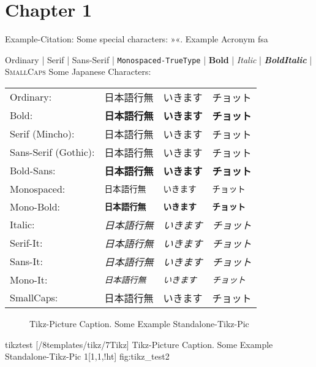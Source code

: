 
\chapter{Chapter 1}
\label{chap:chapter1}

Example-Citation:
\cite{DenKr_denkrement1_indeco}
\nl%
Some special characters:
»«.
\nl%
Example Acronym
\gls{fsa}

\npi%
Ordinary | \textrm{Serif} | \textsf{Sans-Serif} | \texttt{Monospaced-TrueType} | \textbf{Bold} | \textit{Italic} | \textit{\textbf{BoldItalic}} | \textsc{SmallCaps}\nl%
Some Japanese Characters:\nl%
\begin{tabular}{llll}%
Ordinary:&日本語行無&いきます&チョット\\%
Bold:&\textbf{日本語行無}&\textbf{いきます}&\textbf{チョット}\\%
Serif (Mincho):&\textrm{日本語行無}&\textrm{いきます}&\textrm{チョット}\\%
Sans-Serif (Gothic):&\textsf{日本語行無}&\textsf{いきます}&\textsf{チョット}\\%
Bold-Sans:&\textbf{\textsf{日本語行無}}&\textbf{\textsf{いきます}}&\textbf{\textsf{チョット}}\\%
Monospaced:&\texttt{日本語行無}&\texttt{いきます}&\texttt{チョット}\\%
Mono-Bold:&\textbf{\texttt{日本語行無}}&\textbf{\texttt{いきます}}&\textbf{\texttt{チョット}}\\%
\hline%
Italic:&\textit{日本語行無}&\textit{いきます}&\textit{チョット}\\%
Serif-It:&\textit{\textrm{日本語行無}}&\textit{\textrm{いきます}}&\textit{\textrm{チョット}}\\%
Sans-It:&\textit{\textsf{日本語行無}}&\textit{\textsf{いきます}}&\textit{\textsf{チョット}}\\%
Mono-It:&\textit{\texttt{日本語行無}}&\textit{\texttt{いきます}}&\textit{\texttt{チョット}}\\%
\hline%
SmallCaps:&\textsc{日本語行無}&\textsc{いきます}&\textsc{チョット}\\%
\end{tabular}%


\np
%
\begin{figure}[!htpb]
    \centering
    \caption{Tikz-Picture Caption. Some Example Standalone-Tikz-Pic}
    \label{fig:tikz_test}
\end{figure}
%
%
\tikzabb%
{tikztest}%
[\DenKrLayoutMainRootDir/8templates/tikz/7Tikz]%
{%
Tikz-Picture Caption. Some Example Standalone-Tikz-Pic
}%
{1}[1,1,!ht]%
{fig:tikz_test2}%
%